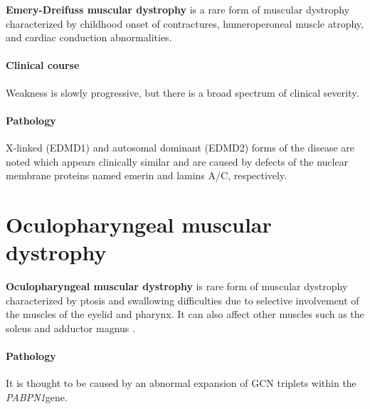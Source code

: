 \textbf{Emery-Dreifuss muscular dystrophy} is a rare form of muscular dystrophy characterized by childhood onset of contractures, humeroperoneal muscle atrophy, and cardiac conduction abnormalities.

\paragraph{Clinical course}

Weakness is slowly progressive, but there is a broad spectrum of clinical severity.

\paragraph{Pathology}

X-linked (EDMD1) and autosomal dominant (EDMD2) forms of the disease are noted which appears clinically similar and are caused by defects of the nuclear membrane proteins named emerin and lamins A/C, respectively.

\section{Oculopharyngeal muscular dystrophy}

\textbf{Oculopharyngeal muscular dystrophy} is rare form of muscular dystrophy characterized by ptosis and swallowing difficulties due to selective involvement of the muscles of the eyelid and pharynx. It can also affect other muscles such as the soleus and adductor magnus .

\paragraph{Pathology}

It is thought to be caused by an abnormal expansion of GCN triplets within the \emph{PABPN1}gene.